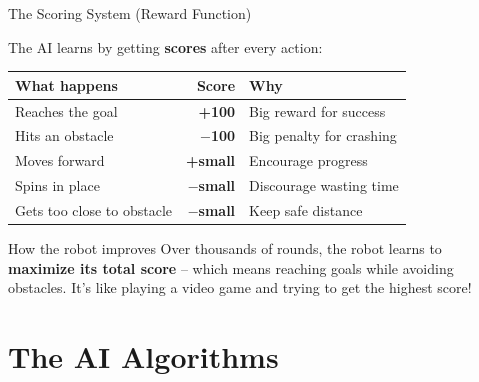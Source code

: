 \documentclass[aspectratio=169, 11pt]{beamer}
\begin{document}
\begin{frame}{The Scoring System (Reward Function)}

  The AI learns by getting \textbf{scores} after every action:

  \vspace{0.3em}

  \begin{center}
  \renewcommand{\arraystretch}{1.3}
  \begin{tabular}{lrl}
    \toprule
    \textbf{What happens} & \textbf{Score} & \textbf{Why}\\
    \midrule
    Reaches the goal & \textbf{+100} & Big reward for success\\
    Hits an obstacle & \textbf{$-$100} & Big penalty for crashing\\
    Moves forward & \textbf{+small} & Encourage progress\\
    Spins in place & \textbf{$-$small} & Discourage wasting time\\
    Gets too close to obstacle & \textbf{$-$small} & Keep safe distance\\
    \bottomrule
  \end{tabular}
  \end{center}

  \vspace{0.4em}

  \begin{exampleblock}{How the robot improves}
    Over thousands of rounds, the robot learns to
    \textbf{maximize its total score} -- which means reaching goals
    while avoiding obstacles. It's like playing a video game and
    trying to get the highest score!
  \end{exampleblock}
\end{frame}

\section{The AI Algorithms}
\end{document}
